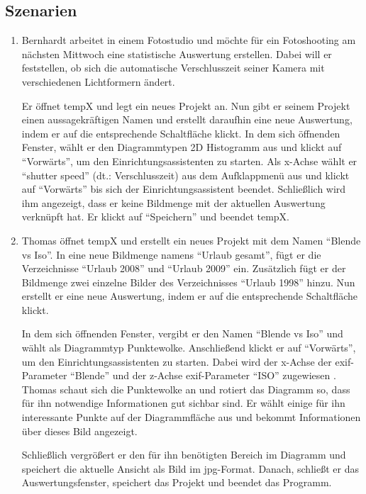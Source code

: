 \subsection{Szenarien}

\begin{enumerate}
	\item Bernhardt arbeitet in einem Fotostudio und möchte für ein Fotoshooting am nächsten Mittwoch eine statistische Auswertung erstellen. Dabei will er feststellen, ob sich die automatische Verschlusszeit seiner Kamera mit verschiedenen \gls{Lichtformer}n ändert.\par
	Er öffnet \gls{tempX} und legt ein neues Projekt an. Nun gibt er seinem Projekt einen aussagekräftigen Namen und erstellt daraufhin eine neue Auswertung, indem er auf die entsprechende Schaltfläche klickt. In dem sich öffnenden Fenster, wählt er den Diagrammtypen 2D Histogramm aus und klickt auf "`Vorwärts"', um den Einrichtungsassistenten zu starten. Als x-Achse wählt er "`shutter speed"' (dt.: Verschlusszeit) aus dem Aufklappmenü aus und klickt auf "`Vorwärts"' bis sich der Einrichtungsassistent beendet. Schließlich wird ihm angezeigt, dass er keine Bildmenge mit der aktuellen Auswertung verknüpft hat. Er klickt auf "`Speichern"' und beendet \gls{tempX}. 

	\item Thomas öffnet \gls{tempX} und erstellt ein neues Projekt mit dem Namen "`Blende vs Iso"'. In eine neue Bildmenge namens "`Urlaub gesamt"', fügt er die Verzeichnisse "`Urlaub 2008"' und "`Urlaub 2009"' ein. Zusätzlich fügt er der Bildmenge zwei einzelne Bilder des Verzeichnisses "`Urlaub 1998"' hinzu.	Nun erstellt er eine neue Auswertung, indem er auf die entsprechende Schaltfläche klickt.\par
	In dem sich öffnenden Fenster, vergibt er den Namen "`Blende vs Iso"' und wählt als Diagrammtyp Punktewolke. Anschließend klickt er auf "`Vorwärts"', um den Einrichtungsassistenten zu starten. Dabei wird der x-Achse der \gls{exif}-Parameter "`Blende"' und der z-Achse \gls{exif}-Parameter "`ISO"' zugewiesen . Thomas schaut sich die Punktewolke an und rotiert das Diagramm so, dass für ihn notwendige Informationen gut sichbar sind. Er wählt einige für ihn interessante Punkte auf der Diagrammfläche aus und bekommt Informationen über dieses Bild angezeigt.\par
	Schließlich vergrößert er den für ihn benötigten Bereich im Diagramm und speichert die aktuelle Ansicht als Bild im \gls{jpg}-Format. Danach, schließt er das Auswertungsfenster, speichert das Projekt und beendet das Programm.


\end{enumerate}
